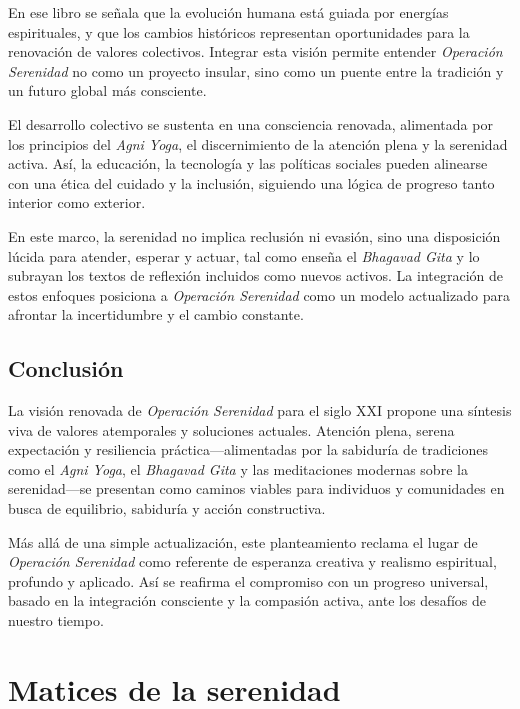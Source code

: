 \documentclass[
]{book}
\begin{document}
En ese libro se señala que la evolución humana está guiada por energías espirituales, y que los cambios históricos representan oportunidades para la renovación de valores colectivos. Integrar esta visión permite entender \emph{Operación Serenidad} no como un proyecto insular, sino como un puente entre la tradición y un futuro global más consciente.

El desarrollo colectivo se sustenta en una consciencia renovada, alimentada por los principios del \emph{Agni Yoga}, el discernimiento de la atención plena y la serenidad activa. Así, la educación, la tecnología y las políticas sociales pueden alinearse con una ética del cuidado y la inclusión, siguiendo una lógica de progreso tanto interior como exterior.

En este marco, la serenidad no implica reclusión ni evasión, sino una disposición lúcida para atender, esperar y actuar, tal como enseña el \emph{Bhagavad Gita} y lo subrayan los textos de reflexión incluidos como nuevos activos. La integración de estos enfoques posiciona a \emph{Operación Serenidad} como un modelo actualizado para afrontar la incertidumbre y el cambio constante.

\section{Conclusión}\label{conclusiuxf3n-3}

La visión renovada de \emph{Operación Serenidad} para el siglo XXI propone una síntesis viva de valores atemporales y soluciones actuales. Atención plena, serena expectación y resiliencia práctica---alimentadas por la sabiduría de tradiciones como el \emph{Agni Yoga}, el \emph{Bhagavad Gita} y las meditaciones modernas sobre la serenidad---se presentan como caminos viables para individuos y comunidades en busca de equilibrio, sabiduría y acción constructiva.

Más allá de una simple actualización, este planteamiento reclama el lugar de \emph{Operación Serenidad} como referente de esperanza creativa y realismo espiritual, profundo y aplicado. Así se reafirma el compromiso con un progreso universal, basado en la integración consciente y la compasión activa, ante los desafíos de nuestro tiempo.

\chapter{Matices de la serenidad}\label{matices-de-la-serenidad}
\end{document}
